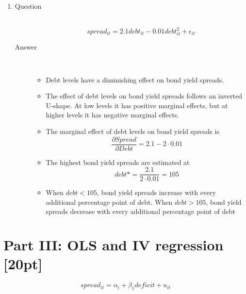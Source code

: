 \documentclass{article}
\begin{document}
\begin{enumerate}
  \item
  \begin{description}
    \item[Question] \hfill \\
    \[ spread_{it} = 2.1debt_{it} - 0.01debt_{it}^2 + \epsilon_{it} \]
    \item[Answer] \hfill \\
    \begin{itemize}
      \item Debt levels have a diminishing effect on bond yield spreads.
      \item The effect of debt levels on bond yield spreads follows an inverted U-shape. At low levels it has positive marginal effects, but at higher levels it has negative marginal effects.
      \item The marginal effect of debt levels on bond yield spreads is 
      \[ \frac{\partial Spread}{\partial Debt} = 2.1 - 2 \cdot 0.01 \]
      \item The  highest bond yield spreads are estimated at 
      \[ debt* = \frac{2.1}{2\cdot 0.01} = 105 \]
      \item When \(debt < 105\), bond yield spreads increase with every additional percentage point of debt. When \(debt > 105\), bond yield spreads decrease with every additional percentage point of debt
    \end{itemize}
  \end{description}
  
\end{enumerate}

\section{Part III: OLS and IV regression [20pt]}

\[spread_{it} = \alpha_i + \beta_{1}deficit + u_{it} \]
\end{document}

